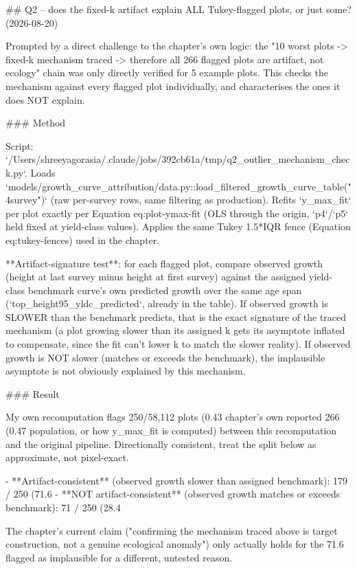 ## Q2 -- does the fixed-k artifact explain ALL Tukey-flagged plots, or just some? (2026-08-20)

Prompted by a direct challenge to the chapter's own logic: the "10 worst plots -> fixed-k
mechanism traced -> therefore all 266 flagged plots are artifact, not ecology" chain was only
directly verified for 5 example plots. This checks the mechanism against every flagged plot
individually, and characterises the ones it does NOT explain.

### Method

Script: `/Users/shreeyagorasia/.claude/jobs/392cb61a/tmp/q2_outlier_mechanism_check.py`. Loads
`models/growth_curve_attribution/data.py::load_filtered_growth_curve_table("4survey")` (raw
per-survey rows, same filtering as production). Refits `y_max_fit` per plot exactly per
Equation eq:plot-ymax-fit (OLS through the origin, `p4`/`p5` held fixed at yield-class values).
Applies the same Tukey 1.5*IQR fence (Equation eq:tukey-fences) used in the chapter.

**Artifact-signature test**: for each flagged plot, compare observed growth (height at last
survey minus height at first survey) against the assigned yield-class benchmark curve's own
predicted growth over the same age span (`top_height95_yldc_predicted`, already in the table).
If observed growth is SLOWER than the benchmark predicts, that is the exact signature of the
traced mechanism (a plot growing slower than its assigned k gets its asymptote inflated to
compensate, since the fit can't lower k to match the slower reality). If observed growth is NOT
slower (matches or exceeds the benchmark), the implausible asymptote is not obviously explained
by this mechanism.

### Result

My own recomputation flags 250/58,112 plots (0.43%
chapter's own reported 266 (0.47%
population, or how y_max_fit is computed) between this recomputation and the original pipeline.
Directionally consistent, treat the split below as approximate, not pixel-exact.

- **Artifact-consistent** (observed growth slower than assigned benchmark): 179 / 250 (71.6%
- **NOT artifact-consistent** (observed growth matches or exceeds benchmark): 71 / 250 (28.4%

The chapter's current claim ("confirming the mechanism traced above is target construction, not
a genuine ecological anomaly") only actually holds for the 71.6%
flagged as implausible for a different, untested reason.

